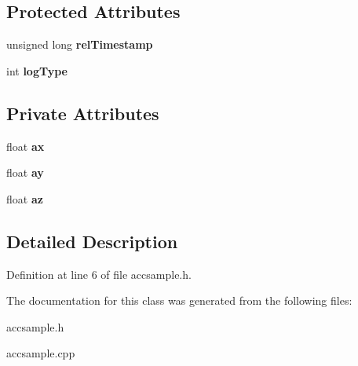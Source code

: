 \subsection*{\-Protected \-Attributes}
\begin{DoxyCompactItemize}
\item 
\hypertarget{class_sample_a24ea733ab0a815949a57aca2a4740e33}{unsigned long {\bfseries rel\-Timestamp}}\label{class_sample_a24ea733ab0a815949a57aca2a4740e33}

\item 
\hypertarget{class_sample_a3a6454628c790459f41de5c83bf3ec7c}{int {\bfseries log\-Type}}\label{class_sample_a3a6454628c790459f41de5c83bf3ec7c}

\end{DoxyCompactItemize}
\subsection*{\-Private \-Attributes}
\begin{DoxyCompactItemize}
\item 
\hypertarget{class_acc_sample_a0971152a4b39e44f004fb3d617c0a285}{float {\bfseries ax}}\label{class_acc_sample_a0971152a4b39e44f004fb3d617c0a285}

\item 
\hypertarget{class_acc_sample_a1fd5b59dc902551e02efc4fe2c83695e}{float {\bfseries ay}}\label{class_acc_sample_a1fd5b59dc902551e02efc4fe2c83695e}

\item 
\hypertarget{class_acc_sample_a332097e8c2743fa40a586a50efdb7efe}{float {\bfseries az}}\label{class_acc_sample_a332097e8c2743fa40a586a50efdb7efe}

\end{DoxyCompactItemize}


\subsection{\-Detailed \-Description}


\-Definition at line 6 of file accsample.\-h.



\-The documentation for this class was generated from the following files\-:\begin{DoxyCompactItemize}
\item 
accsample.\-h\item 
accsample.\-cpp\end{DoxyCompactItemize}
